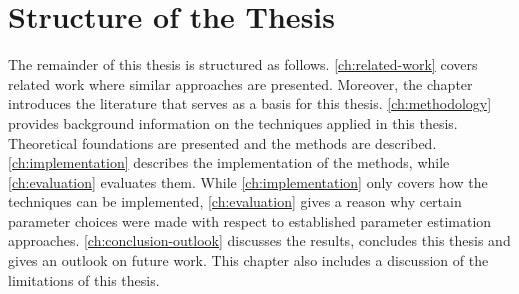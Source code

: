 
\section{Structure of the Thesis}\label{sec:structure-of-the-thesis}
The remainder of this thesis is structured as follows.
\autoref{ch:related-work} covers related work where similar approaches are presented.
Moreover, the chapter introduces the literature that serves as a basis for this thesis.
\autoref{ch:methodology} provides background information on the techniques applied in this thesis.
Theoretical foundations are presented and the methods are described.
\autoref{ch:implementation} describes the implementation of the methods, while
\autoref{ch:evaluation} evaluates them.
While \autoref{ch:implementation} only covers how the techniques can be implemented, 
\autoref{ch:evaluation} gives a reason why certain parameter choices were made with respect to established parameter estimation approaches.
\autoref{ch:conclusion-outlook} discusses the results, concludes this thesis and gives an outlook on future work.
This chapter also includes a discussion of the limitations of this thesis.